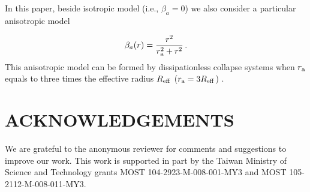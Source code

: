 \documentclass[fleqn,usenatbib,useAMS]{mnras}
\begin{document}
        In this paper, beside isotropic model (i.e., $\beta_a=0$) we also consider a particular anisotropic model

        \begin{equation}
        \label{eq:anisotropic}
        \beta_a(r)=\frac{r^2}{r_{\rm a}^2+r^2}\,.
        \end{equation}
        This anisotropic model can be formed by dissipationless collapse systems when $r_{\rm a}$ equals to three times the effective radius $R_{\rm eff}$ ($r_{\rm a}=3R_{\rm eff}$) \citep{vanAlbada82,MS03}.

\section*{ACKNOWLEDGEMENTS}
    We are grateful to the anonymous reviewer for comments and suggestions to improve our work.
    This work is supported in part by the Taiwan Ministry of Science and Technology grants MOST 104-2923-M-008-001-MY3 and MOST 105-2112-M-008-011-MY3.
\end{document}

